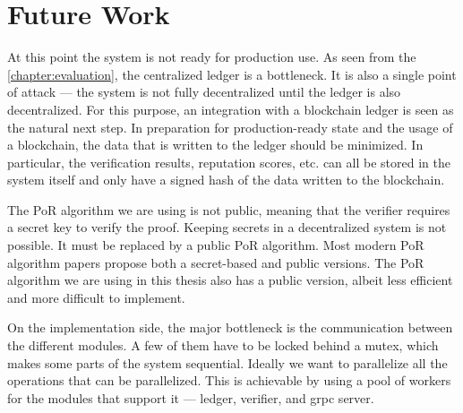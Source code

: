 \chapter{Future Work}
\label{chapter:future-work}

At this point the system is not ready for production use.
As seen from the \autoref{chapter:evaluation}, the centralized ledger
is a bottleneck.
It is also a single point of attack --- the system is not fully decentralized
until the ledger is also decentralized.
For this purpose, an integration with a blockchain ledger is seen as the
natural next step.
In preparation for production-ready state and the usage of a blockchain,
the data that is written to the ledger should be minimized.
In particular, the verification results, reputation scores, etc. can all be
stored in the system itself and only have a signed hash of the data written
to the blockchain.

The PoR algorithm we are using is not public, meaning that the verifier requires
a secret key to verify the proof.
Keeping secrets in a decentralized system is not possible.
It must be replaced by a public PoR algorithm.
Most modern PoR algorithm papers propose both a secret-based and public versions.
The PoR algorithm we are using in this thesis also has a public version,
albeit less efficient and more difficult to implement.

On the implementation side, the major bottleneck is the communication between the different modules.
A few of them have to be locked behind a mutex, which makes some parts of the system sequential.
Ideally we want to parallelize all the operations that can be parallelized.
This is achievable by using a pool of workers for the modules that support it --- ledger,
verifier, and grpc server.
